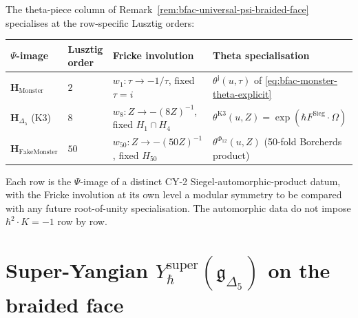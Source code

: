 \begin{remark}
\label{rem:bfac-R-theta-cross-lattice}
The theta-piece column of
Remark~\ref{rem:bfac-universal-psi-braided-face} specialises at
the row-specific Lusztig orders:
\begin{center}
\renewcommand{\arraystretch}{1.3}
\begin{tabular}{@{}llll@{}}
\toprule
$\Psi$-image & Lusztig order & Fricke involution & Theta specialisation \\
\midrule
$\mathbf H_{\mathrm{Monster}}$ & $2$ & $w_1\colon\tau\to -1/\tau$, fixed $\tau = i$
 & $\theta^{\mathrm j}(u,\tau)$ of \eqref{eq:bfac-monster-theta-explicit} \\
$\mathbf H_{\Delta_5}$ (K3) & $8$ & $w_8\colon Z\to -(8Z)^{-1}$, fixed $H_1\cap H_4$
 & $\theta^{\mathrm{K3}}(u,Z) = \exp(\hbar F^{\mathrm{Sieg}}\cdot\Omega)$ \\
$\mathbf H_{\mathrm{FakeMonster}}$ & $50$ & $w_{50}\colon Z\to -(50Z)^{-1}$, fixed $H_{50}$
 & $\theta^{\Phi_{12}}(u,Z)$ (50-fold Borcherds product) \\
\bottomrule
\end{tabular}
\end{center}
Each row is the $\Psi$-image of a distinct CY-2
Siegel-automorphic-product datum, with the Fricke involution at
its own level a modular symmetry to be compared with any future
root-of-unity specialisation. The automorphic data do not impose
\(\hbar^2\cdot K=-1\) row by row.
\end{remark}

\section{Super-Yangian \texorpdfstring{$Y_\hbar^{\mathrm{super}}(\mathfrak{g}_{\Delta_5})$}{Y-hbar-super(g-Delta-5)} on the braided face}
\label{sec:bfac-super-yangian-explicit}

